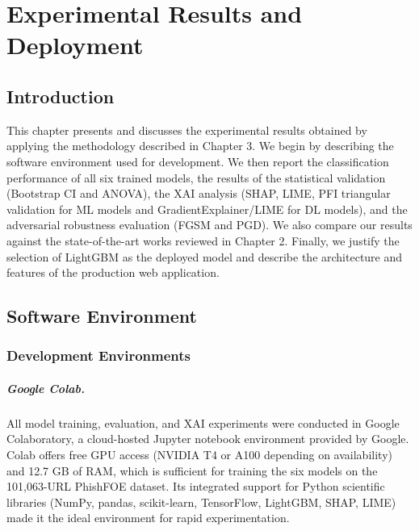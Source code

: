 \chapter{Experimental Results and Deployment}
\vspace{0.5cm}
\minitoc
\vspace{1cm}

\section*{Introduction}

This chapter presents and discusses the experimental results obtained by applying the methodology described in Chapter 3. We begin by describing the software environment used for development. We then report the classification performance of all six trained models, the results of the statistical validation (Bootstrap CI and ANOVA), the XAI analysis (SHAP, LIME, PFI triangular validation for ML models and GradientExplainer/LIME for DL models), and the adversarial robustness evaluation (FGSM and PGD). We also compare our results against the state-of-the-art works reviewed in Chapter 2. Finally, we justify the selection of LightGBM as the deployed model and describe the architecture and features of the production web application.

\section{Software Environment}

\subsection{Development Environments}

\paragraph{Google Colab.}
All model training, evaluation, and XAI experiments were conducted in Google Colaboratory, a cloud-hosted Jupyter notebook environment provided by Google. Colab offers free GPU access (NVIDIA T4 or A100 depending on availability) and 12.7 GB of RAM, which is sufficient for training the six models on the 101,063-URL PhishFOE dataset. Its integrated support for Python scientific libraries (NumPy, pandas, scikit-learn, TensorFlow, LightGBM, SHAP, LIME) made it the ideal environment for rapid experimentation.

